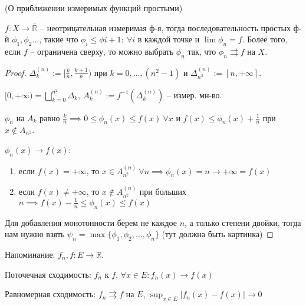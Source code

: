 \begin{theorem}
    (О приближении измеримых функций простыми)

    $f: X \rightarrow \bar{\mathbb{R}}$ -- неотрицательная измеримая ф-я, тогда последовательность простых ф-й $\phi_1, \phi_2 \dots$, такие что $\phi_{i} \leq \phi{i + 1}: \ \forall i$ в каждой точке и $\lim{\phi_n} = f$. Более того, если $f$ -- ограничена сверху, то можно выбрать $\phi_n$ так, что $\phi_n \rightrightarrows f$ на $X$.
\end{theorem}
\begin{proof}
    $\Delta_k^{(n)} := [\frac{k}{n}, \frac{k+1}{n})$ при $k = 0, \dots, (n^2 - 1)$ и $\Delta_{n^2}^{(n)} := [n, +\infty]$.

    $[0, +\infty) = \bigsqcup_{k=0}^{n^2} \Delta_k, \ A_k^{(n)} := f^{-1}(\Delta_k^{(n)})$ -- измер. мн-во.

    $\phi_n$ на $A_k$ равно $\frac{k}{n} \implies 0 \leq \phi_n(x) \leq f(x) \ \forall x$ и $f(x) \leq \phi_n(x) + \frac{1}{n}$ при $x \notin A_{n^2}$.

    $\phi_n(x) \rightarrow f(x)$:

    \begin{enumerate}
        \item {
            если $f(x) = +\infty$, то $x \in A_{n^2}^{(n)} \ \forall n \implies \phi_n(x) = n \rightarrow +\infty = f(x)$
        }
        \item {
            если $f(x) \not = +\infty$, то $x \notin A_{n^2}^{(n)}$ при больших $n \implies f(x) - \frac{1}{n} \leq \phi_n(x) \leq f(x)$
        }
    \end{enumerate}

    Для добавления монотонности берем не каждое $n$, а только степени двойки, тогда нам нужно взять $\psi_n = \max\{ \phi_1, \phi_2, \dots, \phi_n \}$ (тут должна быть картинка)
\end{proof}




Напоминание. $f_n, f : E \rightarrow \mathbb{R}$.

Поточечная сходимость: $f_n$ к $f$, $\forall x \in E: f_n(x) \rightarrow f(x)$

Равномерная сходимость: $f_n \rightrightarrows f$ на $E$, $\sup_{x \in E} |f_n(x) - f(x)| \rightarrow 0$

